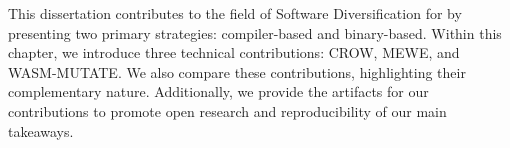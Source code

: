This dissertation contributes to the field of Software Diversification for \Wasm by presenting two primary strategies: compiler-based and binary-based. 
Within this chapter, we introduce three technical contributions: CROW, MEWE, and WASM-MUTATE.
We also compare these contributions, highlighting their complementary nature.
Additionally, we provide the artifacts for our contributions to promote open research and reproducibility of our main takeaways.


\renewcommand{\tool}{CROW\xspace}